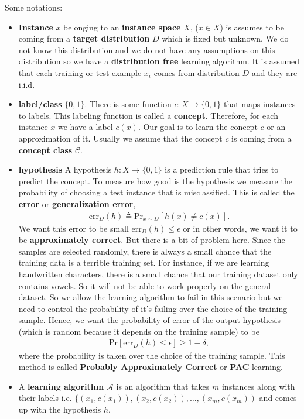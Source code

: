 \documentclass[10pt ]{article}
\begin{document}
Some notations:
\begin{itemize}
\item \textbf{Instance} $x$ belonging to an \textbf{instance space} $X$, ($x \in X$) is assumes to be coming from a \textbf{target distribution} $D$ which is fixed but unknown. We do not know this distribution and we do not have any assumptions on this distribution so we have a \textbf{distribution free} learning algorithm. It is assumed that each training or test example $x_i$ comes from distribution $D$ and they are i.i.d.
\item \textbf{label/class} $\{0,1\}$. There is some function $c:X \to \{0,1\}$ that maps instances to labels. This labeling function is called a \textbf{concept}. Therefore, for each instance $x$ we have a label $c(x)$. Our goal is to learn the concept $c$ or an approximation of it. Usually we assume that the concept $c$ is coming from a \textbf{concept class} $\mathcal{C}$.
\item \textbf{hypothesis} A hypothesis $h:X\to \{0,1\}$ is a prediction rule that tries to predict the concept. To measure how good is the hypothesis we measure the probability of choosing a test instance that is misclassified. This is called the \textbf{error} or \textbf{generalization error},
\begin{align}
\mathrm{err}_D(h) \triangleq \mathrm{Pr}_{x \sim D}\left[ h(x) \neq c(x)\right].
\end{align}
We want this error to be small $\mathrm{err}_D(h)\le  \epsilon$ or in other words, we want it to be \textbf{approximately correct}. But there is a bit of problem here. Since the samples are selected randomly, there is always a small chance that the training data 
is a terrible training set. For instance, if we are learning handwritten characters, there is a small chance that our training dataset only contains vowels. So it will not be able to work properly on the general dataset. So we allow the learning algorithm to fail in this scenario but we need to control the probability of it's failing over the choice of the training sample. Hence, we want the probability of error of the output hypothesis (which is random because it depends on the training sample) to be
\begin{align}
\mathrm{Pr} \left[ \mathrm{err}_D(h) \le \epsilon \right] \ge 1-\delta,
\end{align}
where the probability is taken over the choice of the training sample. This method is called \textbf{Probably Approximately Correct} or \textbf{PAC} learning. 
\item A \textbf{learning algorithm} $\mathcal{A}$ is an algorithm that takes $m$ instances along with their labels i.e. $\{(x_1, c(x_1)), (x_2, c(x_2)), \dots, (x_m, c(x_m))$ and comes up with the hypothesis $h$. 

\end{itemize}
\end{document}
